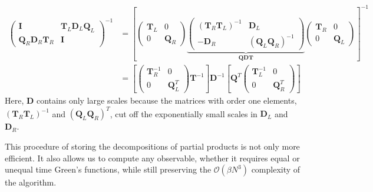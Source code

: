 \begin{equation}
\begin{split}
\begin{pmatrix}
\bm I & \bm T_L \bm D_L \bm Q_L \\
\bm Q_R \bm D_R \bm T_R & \bm I
\end{pmatrix}^{-1}
&= \left[
\begin{pmatrix}
\bm T_L & 0 \\
0 & \bm Q_R 
\end{pmatrix}
\underbrace{\begin{pmatrix}
(\bm T_R \bm T_L)^{-1} & \bm D_L \\
- \bm D_R & (\bm Q_L \bm Q_R)^{-1}
\end{pmatrix}}_{\bm Q \bm D \bm T}
\begin{pmatrix}
\bm T_R & 0 \\
0 & \bm Q_L
\end{pmatrix}
\right]^{-1} \\
&= \left[
\begin{pmatrix}
\bm T_R^{-1} & 0 \\
0 & \bm Q_L^T
\end{pmatrix}
\bm T^{-1} \right]
\bm D^{-1}
\left[
\bm Q^T
\begin{pmatrix}
\bm T_L^{-1} & 0 \\
0 & \bm Q_R^T
\end{pmatrix}
\right]
\end{split}
\end{equation}
Here, $\bm D$ contains only large scales because the matrices with order one elements, $(\bm T_R \bm T_L)^{-1}$ and $(\bm Q_L \bm Q_R)^T$, cut off the exponentially small scales in $\bm D_L$ and $\bm D_R$.

This procedure of storing the decompositions of partial products is not only more efficient.
It also allows us to compute any observable, whether it requires equal or unequal time Green's functions, while still preserving the $\mathcal{O} (\beta N^3 )$ complexity of the algorithm.